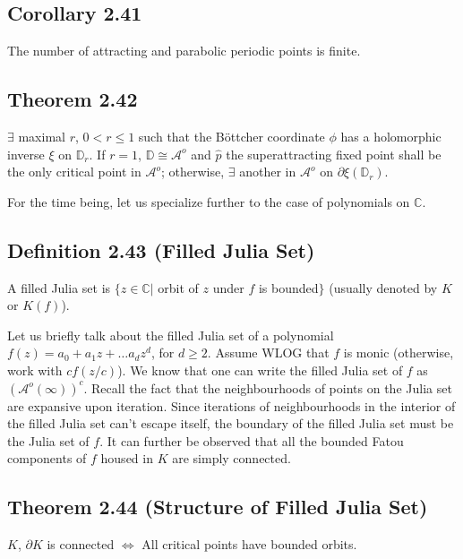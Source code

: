 \documentclass[11pt,a4paper]{article}
\begin{document}

        \subsection*{Corollary 2.41}
        The number of attracting and parabolic periodic points is finite.


        \subsection*{Theorem 2.42} $\exists$ maximal $r$, $0<r \leq 1$ such that the B\"ottcher coordinate $\phi$ has a holomorphic inverse $\xi$ on $\mathbb{D}_r$. If $r=1$, $\mathbb{D} \cong \mathcal{A}^o$ and $\hat{p}$ the superattracting fixed point shall be the only critical point in $\mathcal{A}^o$; otherwise, $\exists$ another in $\mathcal{A}^o$ on $\partial \xi(\mathbb{D}_r)$.



        For the time being, let us specialize further to the case of polynomials on $\mathbb{C}$.

        \subsection*{Definition 2.43 (Filled Julia Set)} A filled Julia set is $\{z\in \mathbb{C}|$ orbit of $z$ under $f$ is bounded$\}$ (usually denoted by $K$ or $K(f)$).



        Let us briefly talk about the filled Julia set of a polynomial $f(z) = a_0 + a_1z +\ldots a_dz^d$, for $d \geq 2$. Assume WLOG that $f$ is monic (otherwise, work with $cf(z/c)$). We know that one can write the filled Julia set of $f$ as $(\mathcal{A}^o(\infty))^c$. Recall the fact that the neighbourhoods of points on the Julia set are expansive upon iteration. Since iterations of neighbourhoods in the interior of the filled Julia set can't escape itself, the boundary of the filled Julia set must be the Julia set of $f$. It can further be observed that all the bounded Fatou components of $f$ housed in $K$ are simply connected.

        \subsection*{Theorem 2.44 (Structure of Filled Julia Set)} $K$, $\partial K$ is connected $\iff$ All critical points have bounded orbits.
\end{document}
